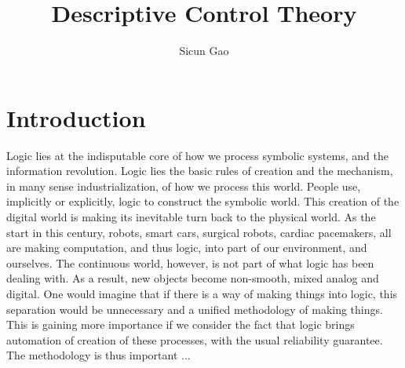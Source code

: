 \documentclass[10pt]{article}
\title{Descriptive Control Theory}
\author{Sicun Gao}
\date{}
\theoremstyle{definition}
\begin{document}
\maketitle
\thispagestyle{empty}

\section{Introduction}

Logic lies at the indisputable core of how we process symbolic systems, and the information revolution. Logic lies the basic rules of creation and the mechanism, in many sense industrialization, of how we process this world. People use, implicitly or explicitly, logic to construct the symbolic world. This creation of the digital world is making its inevitable turn back to the physical world. As the start in this century, robots, smart cars, surgical robots, cardiac pacemakers, all are making computation, and thus logic, into part of our environment, and ourselves. The continuous world, however, is not part of what logic has been dealing with. As a result, new objects become non-smooth, mixed analog and digital. One would imagine that if there is a way of making things into logic, this separation would be unnecessary and a unified methodology of making things. This is gaining more importance if we consider the fact that logic brings automation of creation of these processes, with the usual reliability guarantee. The methodology is thus important ...
\end{document}
